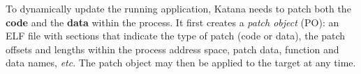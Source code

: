 
To dynamically update the running application, Katana needs to patch
both the {\bf code} and the {\bf data} within the process.  It first
creates a {\it patch object} (PO): an ELF file with sections that
indicate the type of patch (code or data), the patch offsets and
lengths within the process address space, patch data, function and
data names, {\it etc}. The patch object may then be applied to the
target at any time.
